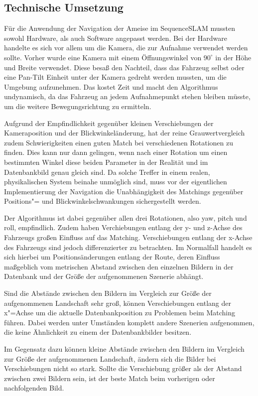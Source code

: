\documentclass[12pt,a4paper,titlepage]{scrartcl}
\begin{document}
\subsection{Technische Umsetzung}
Für die Anwendung der Navigation der Ameise im SequenceSLAM mussten sowohl Hardware, als auch Software angepasst werden. Bei der Hardware handelte es sich vor allem um die Kamera, die zur Aufnahme verwendet werden sollte. Vorher wurde eine Kamera mit einem Öffnungswinkel von $90^\circ$ in der Höhe und Breite verwendet. Diese besaß den Nachteil, dass das Fahrzeug selbst oder eine Pan-Tilt Einheit unter der Kamera gedreht werden mussten, um die Umgebung aufzunehmen. Das kostet Zeit und macht den Algorithmus undynamisch, da das Fahrzeug an jedem Aufnahmepunkt stehen bleiben müsste, um die weitere Bewegungsrichtung zu ermitteln.

Aufgrund der Empfindlichkeit gegenüber kleinen Verschiebungen der Kameraposition und der Blickwinkeländerung, hat der reine Grauwertvergleich zudem Schwierigkeiten einen guten Match bei verschiedenen Rotationen zu finden. Dies kann nur dann gelingen, wenn nach einer Rotation um einen bestimmten Winkel diese beiden Parameter in der Realität und im Datenbankbild genau gleich sind. Da solche Treffer in einem realen, physikalischen System beinahe unmöglich sind, muss vor der eigentlichen Implementierung der Navigation die Unabhängigkeit des Matchings gegenüber Positions"= und Blickwinkelschwankungen sichergestellt werden.

Der Algorithmus ist dabei gegenüber allen drei Rotationen, also yaw, pitch und roll, empfindlich. Zudem haben Verchiebungen entlang der y- und z-Achse des Fahrzeugs großen Einfluss auf das Matching. Verschiebungen entlang der x-Achse des Fahrzeugs sind jedoch differenzierter zu betrachten. Im Normalfall handelt es sich hierbei um Positionsänderungen entlang der Route, deren Einfluss maßgeblich vom metrischen Abstand zwischen den einzelnen Bildern in der Datenbank und der Größe der aufgenommenen Szenerie abhängt. 

Sind die Abstände zwischen den Bildern im Vergleich zur Größe der aufgenommenen Landschaft sehr groß, können Verschiebungen entlang der x"=Achse um die aktuelle Datenbankposition zu Problemen beim Matching führen. Dabei werden unter Umständen komplett andere Szenerien aufgenommen, die keine Ähnlichkeit zu einem der Datenbankbilder besitzen.

Im Gegensatz dazu können kleine Abstände zwischen den Bildern im Vergleich zur Größe der aufgenommenen Landschaft, ändern sich die Bilder bei Verschiebungen nicht so stark. Sollte die Verschiebung größer als der Abstand zwischen zwei Bildern sein, ist der beste Match beim vorherigen oder nachfolgenden Bild. 
\end{document}
